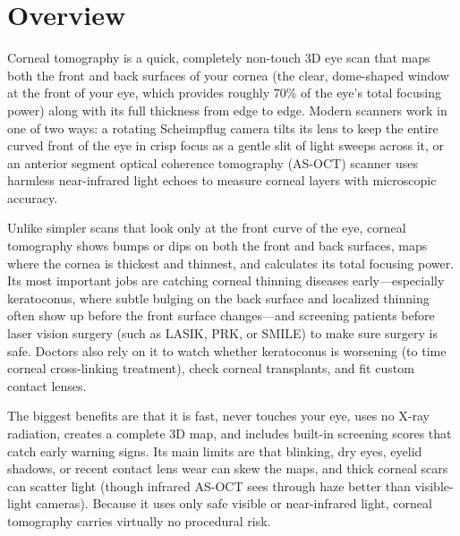 \label{ch:infographic-corneal-tomography}

\section{Overview}

Corneal tomography is a quick, completely non-touch 3D eye scan that maps both the front and back surfaces of your cornea (the clear, dome-shaped window at the front of your eye, which provides roughly 70\% of the eye's total focusing power) along with its full thickness from edge to edge. Modern scanners work in one of two ways: a rotating Scheimpflug camera tilts its lens to keep the entire curved front of the eye in crisp focus as a gentle slit of light sweeps across it, or an anterior segment optical coherence tomography (AS-OCT) scanner uses harmless near-infrared light echoes to measure corneal layers with microscopic accuracy.

Unlike simpler scans that look only at the front curve of the eye, corneal tomography shows bumps or dips on both the front and back surfaces, maps where the cornea is thickest and thinnest, and calculates its total focusing power. Its most important jobs are catching corneal thinning diseases early---especially keratoconus, where subtle bulging on the back surface and localized thinning often show up before the front surface changes---and screening patients before laser vision surgery (such as LASIK, PRK, or SMILE) to make sure surgery is safe. Doctors also rely on it to watch whether keratoconus is worsening (to time corneal cross-linking treatment), check corneal transplants, and fit custom contact lenses.

The biggest benefits are that it is fast, never touches your eye, uses no X-ray radiation, creates a complete 3D map, and includes built-in screening scores that catch early warning signs. Its main limits are that blinking, dry eyes, eyelid shadows, or recent contact lens wear can skew the maps, and thick corneal scars can scatter light (though infrared AS-OCT sees through haze better than visible-light cameras). Because it uses only safe visible or near-infrared light, corneal tomography carries virtually no procedural risk.

